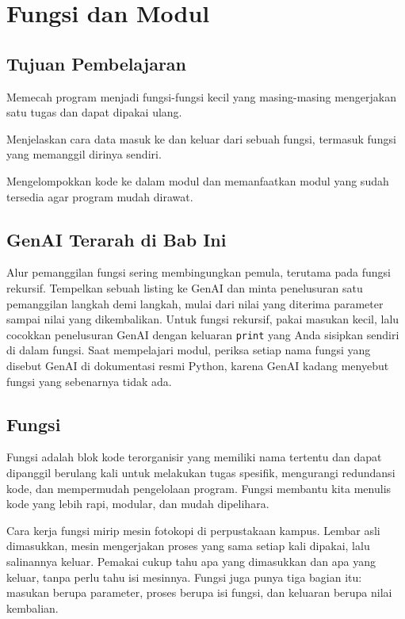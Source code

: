 \chapter{Fungsi dan Modul}

\section*{Tujuan Pembelajaran}
\begin{daftarrapat}
  \item Memecah program menjadi fungsi-fungsi kecil yang masing-masing mengerjakan satu tugas dan dapat dipakai ulang.
  \item Menjelaskan cara data masuk ke dan keluar dari sebuah fungsi, termasuk fungsi yang memanggil dirinya sendiri.
  \item Mengelompokkan kode ke dalam modul dan memanfaatkan modul yang sudah tersedia agar program mudah dirawat.
\end{daftarrapat}

\section*{GenAI Terarah di Bab Ini}

Alur pemanggilan fungsi sering membingungkan pemula, terutama pada fungsi rekursif. Tempelkan sebuah listing ke GenAI dan minta penelusuran satu pemanggilan langkah demi langkah, mulai dari nilai yang diterima parameter sampai nilai yang dikembalikan. Untuk fungsi rekursif, pakai masukan kecil, lalu cocokkan penelusuran GenAI dengan keluaran \texttt{print} yang Anda sisipkan sendiri di dalam fungsi. Saat mempelajari modul, periksa setiap nama fungsi yang disebut GenAI di dokumentasi resmi Python, karena GenAI kadang menyebut fungsi yang sebenarnya tidak ada.

\section{Fungsi}
Fungsi adalah blok kode terorganisir yang memiliki nama tertentu dan dapat dipanggil berulang kali untuk melakukan tugas spesifik, mengurangi redundansi kode, dan mempermudah pengelolaan program. Fungsi membantu kita menulis kode yang lebih rapi, modular, dan mudah dipelihara.

Cara kerja fungsi mirip mesin fotokopi di perpustakaan kampus. Lembar asli dimasukkan, mesin mengerjakan proses yang sama setiap kali dipakai, lalu salinannya keluar. Pemakai cukup tahu apa yang dimasukkan dan apa yang keluar, tanpa perlu tahu isi mesinnya. Fungsi juga punya tiga bagian itu: masukan berupa parameter, proses berupa isi fungsi, dan keluaran berupa nilai kembalian.

